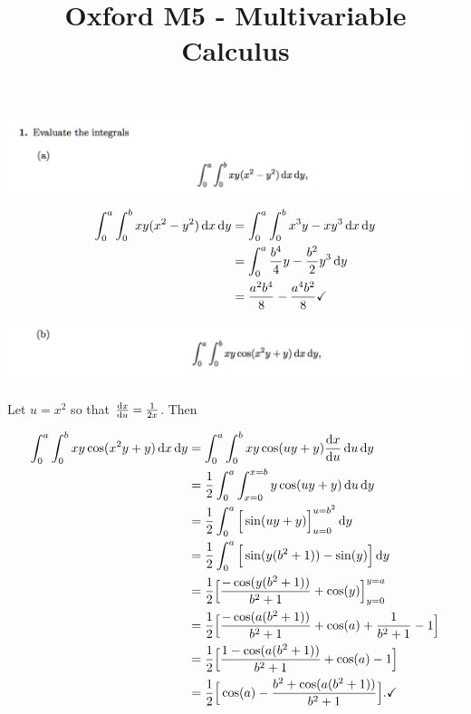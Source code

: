\documentclass[12pt]{article}
\begin{document}
\title{Oxford M5 - Multivariable Calculus
  }
\author{}
\date{}
\maketitle


\section{}

\begin{mdframed}
\includegraphics[width=400pt]{img/oxford-prelims-M5-multivariable-calc-1-1-a.png}
\end{mdframed}

\begin{align*}
  \int_0^a\int_0^b xy(x^2 - y^2)\dx\dy
  &= \int_0^a\int_0^b x^3y - xy^3\dx\dy\\
  &= \int_0^a\frac{b^4}{4}y - \frac{b^2}{2}y^3\dy\\
  &= \frac{a^2b^4}{8} - \frac{a^4b^2}{8} \checkmark
\end{align*}

\newpage
\begin{mdframed}
\includegraphics[width=400pt]{img/oxford-prelims-M5-multivariable-calc-1-1-b.png}
\end{mdframed}

Let $u = x^2$ so that $\dxdu = \frac{1}{2x}$. Then

\begin{align*}
  \int_0^a\int_0^b xy\cos(x^2y + y)\dx\dy
  &= \int_0^a\int_0^b xy\cos(uy + y)\dxdu \du\dy\\
  &= \frac{1}{2}\int_0^a\int_{x=0}^{x=b} y\cos(uy + y) \du\dy\\
  &= \frac{1}{2}\int_0^a\Big[\sin(uy + y) \Big]_{u=0}^{u=b^2}\dy\\
  &= \frac{1}{2}\int_0^a\Big[\sin(y(b^2 + 1)) - \sin(y)\Big]\dy\\
  &= \frac{1}{2}\Big[\frac{-\cos(y(b^2 + 1))}{b^2 + 1} + \cos(y)\Big]_{y=0}^{y=a}\\
  &= \frac{1}{2}\Big[\frac{-\cos(a(b^2 + 1))}{b^2 + 1} + \cos(a) +
                     \frac{1}{b^2 + 1} - 1 \Big]\\
  &= \frac{1}{2}\Big[\frac{1 -\cos(a(b^2 + 1))}{b^2 + 1} + \cos(a) - 1 \Big]\\
  &= \frac{1}{2}\Big[\cos(a) - \frac{b^2 + \cos(a(b^2 + 1))}{b^2 + 1} \Big]. \checkmark
\end{align*}
\end{document}
